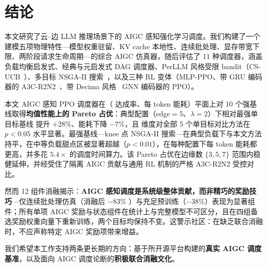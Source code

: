 \section{结论}
\label{sec:conclusion}

本文研究了云--边 LLM 推理场景下的 AIGC 感知强化学习调度。我们构建了一个建模五项物理特性---模型权重驻留、KV cache 本地性、连续批处理、显存带宽下限、两阶段请求生命周期---的综合 AIGC 仿真器，随后评估了 11 种调度器，涵盖负载均衡启发式、经典与元启发式 DAG 调度器、PerLLM 风格受限 bandit（CS-UCB~\cite{yang2024perllm}）、多目标 NSGA-II 搜索~\cite{yu2025llmrouting}，以及三种 RL 变体（MLP-PPO、带 GRU 编码器的 A3C-R2N2~\cite{tuli2022a3cr2n}、带 Decima 风格~\cite{mao2019decima} GNN 编码器的 PPO）。

本文 AIGC 感知 PPO 调度器在（\slo{} 达成率、每 token 能耗）平面上对 10 个强基线取得\textbf{均值性能上的 Pareto 占优}：典型配置（edge${=}5$、$\lambda{=}2$）下相对最强单目标基线 \slo{} 提升 $+28\%$、能耗下降 $-7\%$，且 \slo{} 维度对全部 5 个单目标对比方法在 $p<0.05$ 水平显著。最强基线---knee 点 NSGA-II 搜索---在典型负载下与本文方法持平，在中等负载甜点区被显著超越（$p<0.01$），在每种配置下每 token 能耗都更高，并多花 $5.4\times$ 的调度时间算力。该 Pareto 占优在边缘数 $\{3, 5, 7\}$ 范围内稳健延伸，并经受住了隔离 AIGC 贡献与通用 RL 机制的严格 A3C-R2N2 受控对比。

然而 12 组件消融揭示：\textbf{AIGC 感知调度是系统级整体贡献，而非精巧的奖励技巧}---仅连续批处理仿真（消融后 $-83\%$ \slo{}）与充足预训练（$-38\%$）表现为显著组件；所有单项 AIGC 奖励与状态组件在统计上与完整模型不可区分，且在四组备选奖励权重向量下重新训练，两个目标均保持不变。这警示社区：在缺乏联合消融时，不应声称特定 AIGC 奖励项带来增益。

我们希望本工作支持两条更长期的方向：基于所开源平台构建的\textbf{真实 AIGC 调度基准}，以及面向 AIGC 调度论断的\textbf{积极联合消融文化}。
